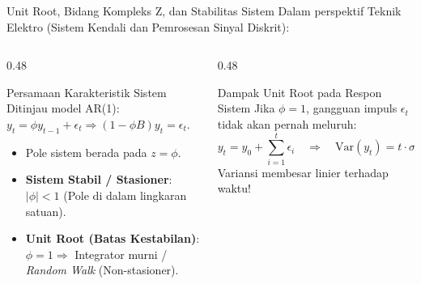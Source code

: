 \documentclass[aspectratio=169, 10pt]{beamer}
\begin{document}
\begin{frame}{Unit Root, Bidang Kompleks Z, dan Stabilitas Sistem}
    Dalam perspektif Teknik Elektro (Sistem Kendali dan Pemrosesan Sinyal Diskrit):
    \begin{columns}[T]
        \begin{column}{0.48\textwidth}
            \begin{block}{Persamaan Karakteristik Sistem}
                Ditinjau model AR(1): $y_t = \phi y_{t-1} + \epsilon_t \Rightarrow (1 - \phi B)y_t = \epsilon_t$.
                \begin{itemize}
                    \item Pole sistem berada pada $z = \phi$.
                    \item \textbf{Sistem Stabil / Stasioner}: $|\phi| < 1$ (Pole di dalam lingkaran satuan).
                    \item \textbf{Unit Root (Batas Kestabilan)}: $\phi = 1 \Rightarrow$ Integrator murni / \textit{Random Walk} (Non-stasioner).
                \end{itemize}
            \end{block}
        \end{column}
        \begin{column}{0.48\textwidth}
            \begin{alertblock}{Dampak Unit Root pada Respon Sistem}
                Jika $\phi = 1$, gangguan impuls $\epsilon_t$ tidak akan pernah meluruh:
                \[
                    y_t = y_0 + \sum_{i=1}^t \epsilon_i \quad \Longrightarrow \quad \mathrm{Var}(y_t) = t \cdot \sigma^2 \to \infty
                \]
                Variansi membesar linier terhadap waktu!
            \end{alertblock}
        \end{column}
    \end{columns}
\end{frame}
\end{document}

